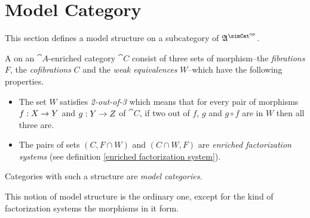 \documentclass[csh.tex]{subfiles}
\begin{document}
\section{Model Category}
This section defines a model structure on a subcategory of $\ambient\s$.


\begin{definition} A  on an $\cat A$-enriched category $\cat C$ consist of three sets of morphism--the \emph{fibrations} $F$, the \emph{cofibrations} $C$ and the \emph{weak equivalences} $W$--which have the following properties. 
\begin{itemize}
\item The set $W$ satisfies \emph{2-out-of-3} which means that for every pair of morphisms $f: X\to Y$ and $g: Y\to Z$ of $\cat C$, if two out of $f$, $g$ and $g\circ f$ are in $W$ then all three are. 
\item The pairs of sets $(C,F\cap W)$ and $(C\cap W,F)$ are \emph{enriched factorization systems} (see definition \ref{enriched factorization system}). 
\end{itemize}

Categories with such a structure are \emph{model categories}.
\end{definition}

This notion of model structure is the ordinary one, except for the kind of factorization systems the morphisms in it form.
\end{document}
